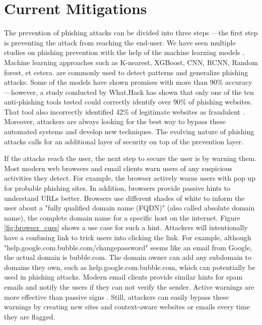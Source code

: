 \section{Current Mitigations}
The prevention of phishing attacks can be divided into three steps \cite{vayansky}—the first step is preventing the attack from reaching the end-user. We have seen multiple studies on phishing prevention with the help of the machine learning models \cite{yang_zheng_wu_wu_wang_2021, sahingoz_buber_demir_diri_2019}. Machine learning approaches such as K-nearest, XGBoost, CNN, RCNN, Random forest, et cetera. are commonly used to detect patterns and generalize phishing attacks. Some of the models have shown promises with more than 90\% accuracy—however, a study conducted by What.Hack has shown that only one of the ten anti-phishing tools tested could correctly identify over 90\% of phishing websites. That tool also incorrectly identified 42\% of legitimate websites as fraudulent \cite{what_hack}. Moreover, attackers are always looking for the best way to bypass these automated systems and develop new techniques. The evolving nature of phishing attacks calls for an additional layer of security on top of the prevention layer.

If the attacks reach the user, the next step to secure the user is by warning them. Most modern web browsers and email clients warn users of any suspicious activities they detect. For example, the browser actively warns users with pop up for probable phishing sites. In addition, browsers provide passive hints to understand URLs better. Browsers use different shades of white to inform the user about a "fully qualified domain name (FQDN)" (also called absolute domain name), the complete domain name for a specific host on the internet. Figure \ref*{fig:browser_cues} shows a use case for such a hint. Attackers will intentionally have a confusing link to trick users into clicking the link. For example, although "help.google.com.bubble.com/changepassword" seems like an email from Google, the actual domain is bubble.com. The domain owner can add any subdomain to domains they own, such as help.google.com.bubble.com, which can potentially be used in phishing attacks. Modern email clients provide similar hints for spam emails and notify the users if they can not verify the sender. Active warnings are more effective than passive signs \cite{vayansky}. Still, attackers can easily bypass these warnings by creating new sites and context-aware websites or emails every time they are flagged.

